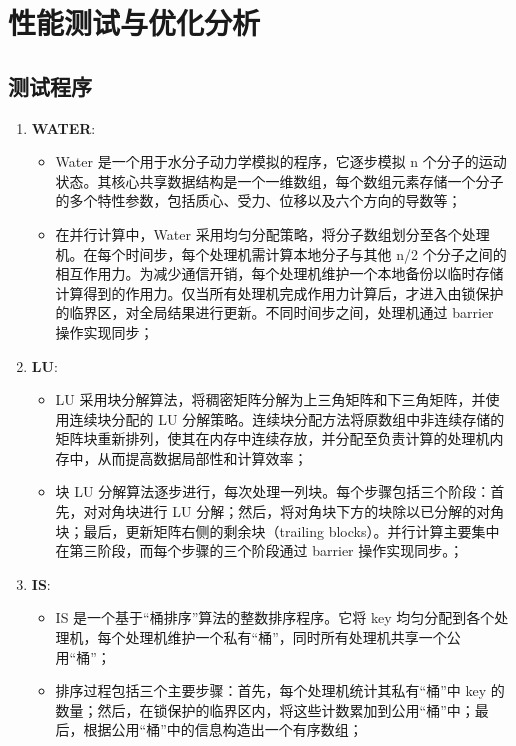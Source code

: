 \chapter{性能测试与优化分析}\label{chap:experiments}{
\section{测试程序}


\begin{enumerate}[leftmargin=1em, align=left]
    \item \textbf{WATER}:
        \begin{itemize}[leftmargin=*, nosep]
            \item Water 是一个用于水分子动力学模拟的程序，它逐步模拟 n 个分子的运动状态。其核心共享数据结构是一个一维数组，每个数组元素存储一个分子的多个特性参数，包括质心、受力、位移以及六个方向的导数等；
            \item 在并行计算中，Water 采用均匀分配策略，将分子数组划分至各个处理机。在每个时间步，每个处理机需计算本地分子与其他 n/2 个分子之间的相互作用力。为减少通信开销，每个处理机维护一个本地备份以临时存储计算得到的作用力。仅当所有处理机完成作用力计算后，才进入由锁保护的临界区，对全局结果进行更新。不同时间步之间，处理机通过 barrier 操作实现同步；
        \end{itemize}
    \item \textbf{LU}: 
        \begin{itemize}[leftmargin=*, nosep]
            \item LU 采用块分解算法，将稠密矩阵分解为上三角矩阵和下三角矩阵，并使用连续块分配的 LU 分解策略。连续块分配方法将原数组中非连续存储的矩阵块重新排列，使其在内存中连续存放，并分配至负责计算的处理机内存中，从而提高数据局部性和计算效率；
            \item 块 LU 分解算法逐步进行，每次处理一列块。每个步骤包括三个阶段：首先，对对角块进行 LU 分解；然后，将对角块下方的块除以已分解的对角块；最后，更新矩阵右侧的剩余块（trailing blocks）。并行计算主要集中在第三阶段，而每个步骤的三个阶段通过 barrier 操作实现同步。；
        \end{itemize}
    \item \textbf{IS}: 
        \begin{itemize}[leftmargin=*, nosep]
            \item IS 是一个基于“桶排序”算法的整数排序程序。它将 key 均匀分配到各个处理机，每个处理机维护一个私有“桶”，同时所有处理机共享一个公用“桶”；
            \item 排序过程包括三个主要步骤：首先，每个处理机统计其私有“桶”中 key 的数量；然后，在锁保护的临界区内，将这些计数累加到公用“桶”中；最后，根据公用“桶”中的信息构造出一个有序数组；

\end{itemize}
\end{enumerate}}
